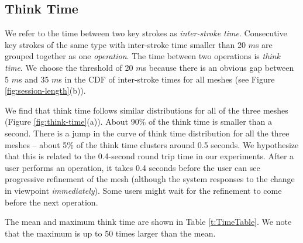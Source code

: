\subsection{Think Time}
We refer to the time between two key strokes as \textit{inter-stroke time}. 
Consecutive key strokes of the same type with inter-stroke time smaller than 20 $m$s
are grouped together as one \textit{operation}. 
The time between two operations is \textit{think time}. 
We choose the threshold of 20 $m$s because there is an obvious gap between 5 $m$s and 35 $m$s
in the CDF of inter-stroke times for all meshes (see Figure \ref{fig:session-length}(b)).

 


We find that think time follows similar distributions for all of the three meshes (Figure \ref{fig:think-time}(a)). 
About 90\% of the think time is smaller than a second. There is a jump in the curve of think time distribution for all the three meshes -- 
about 5\% of the think time clusters around 0.5 seconds. 
We hypothesize that this is related to the 0.4-second round trip time in our experiments. 
After a user performs an operation, it takes 0.4 seconds before the user can see progressive refinement of the mesh
(although the system responses to the change in viewpoint \textit{immediately}). 
Some users might wait for the refinement to come before the next operation.

The mean and maximum think time are shown in Table \ref{t:TimeTable}. We note that the maximum is up to 50 times larger than the mean.

